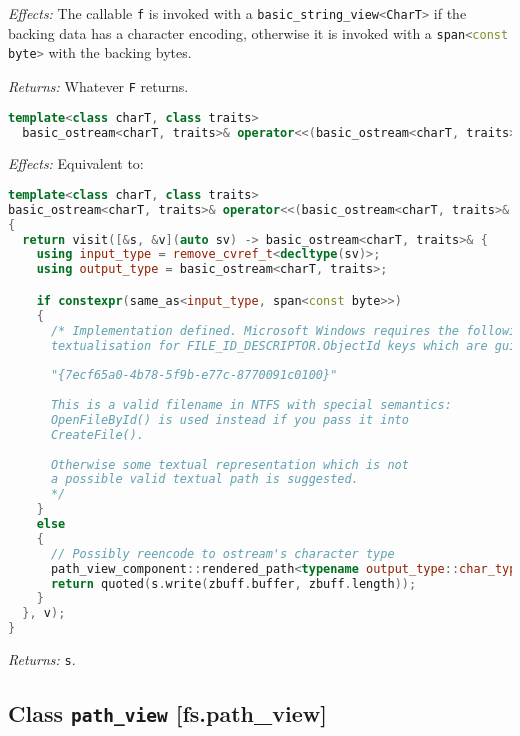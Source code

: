 \documentclass[11pt]{article}
\newcommand{\code}[2][cpp]{\lstinline[language=#1,basicstyle=\small\ttfamily]{#2}}
\newcommand{\desc}[1]{\textit{#1}}
\newcommand{\effects}{\desc{Effects: }}
\newcommand{\returns}{\desc{Returns: }}
\begin{document}
\effects The callable \code{f} is invoked with a \code{basic_string_view<CharT>} if the backing data has a character encoding, otherwise it is invoked with a \code{span<const byte>} with the backing bytes.

\returns Whatever \code{F} returns.\\

\begin{lstlisting}[language=cpp]
  template<class charT, class traits>
  basic_ostream<charT, traits>& operator<<(basic_ostream<charT, traits>& s, path_view_component v);
\end{lstlisting}

\effects Equivalent to:\begin{lstlisting}[language=cpp]
template<class charT, class traits>
basic_ostream<charT, traits>& operator<<(basic_ostream<charT, traits>& s, path_view_component v)
{
  return visit([&s, &v](auto sv) -> basic_ostream<charT, traits>& {
    using input_type = remove_cvref_t<decltype(sv)>;
    using output_type = basic_ostream<charT, traits>;

    if constexpr(same_as<input_type, span<const byte>>)
    {
      /* Implementation defined. Microsoft Windows requires the following
      textualisation for FILE_ID_DESCRIPTOR.ObjectId keys which are guids:
      
      "{7ecf65a0-4b78-5f9b-e77c-8770091c0100}"
      
      This is a valid filename in NTFS with special semantics:
      OpenFileById() is used instead if you pass it into
      CreateFile().
      
      Otherwise some textual representation which is not
      a possible valid textual path is suggested.
      */
    }
    else
    {
      // Possibly reencode to ostream's character type
      path_view_component::rendered_path<typename output_type::char_type> zbuff(v, path_view_component::not_zero_terminated);
      return quoted(s.write(zbuff.buffer, zbuff.length));
    }
  }, v);
}
\end{lstlisting}

\returns \code{s}.\\

\subsection*{Class \code{path_view} [fs.path\_view]}
\end{document}
